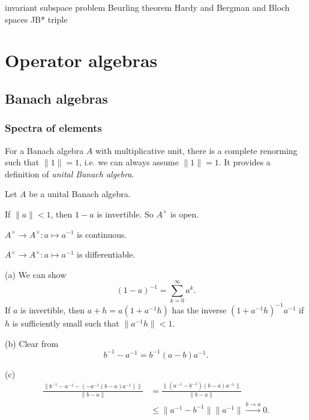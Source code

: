 \documentclass{../../large}
\begin{document}
invariant subspace problem
Beurling theorem
Hardy and Bergman and Bloch spaces
JB* triple





\part{Operator algebras}
\chapter{Banach algebras}

\section{Spectra of elements}

\begin{prb}
For a Banach algebra $A$ with multiplicative unit, there is a complete renorming such that $\|1\|=1$, i.e. we can always assume $\|1\|=1$.
It provides a definition of \emph{unital Banach algebra}.

Let $A$ be a unital Banach algebra.
\begin{parts}
\item If $\|a\|<1$, then $1-a$ is invertible. So $A^\times$ is open.
\item $A^\times\to A^\times:a\mapsto a^{-1}$ is continuous.
\item $A^\times\to A^\times:a\mapsto a^{-1}$ is differentiable.
\end{parts}
\end{prb}
\begin{pf}
(a)
We can show
\[(1-a)^{-1}=\sum_{k=0}^\infty a^k.\]
If $a$ is invertible, then $a+h=a(1+a^{-1}h)$ has the inverse $(1+a^{-1}h)^{-1}a^{-1}$ if $h$ is sufficiently small such that $\|a^{-1}h\|<1$.

(b)
Clear from
\[b^{-1}-a^{-1}=b^{-1}(a-b)a^{-1}.\]

(c)
\begin{align*}
\frac{\|b^{-1}-a^{-1}-(-a^{-1}(b-a)a^{-1})\|}{\|b-a\|}
&=\frac{\|(a^{-1}-b^{-1})(b-a)a^{-1}\|}{\|b-a\|}\\
&\le\|a^{-1}-b^{-1}\|\|a^{-1}\|\xrightarrow{b\to a}0.
\end{align*}
\end{pf}
\end{document}
